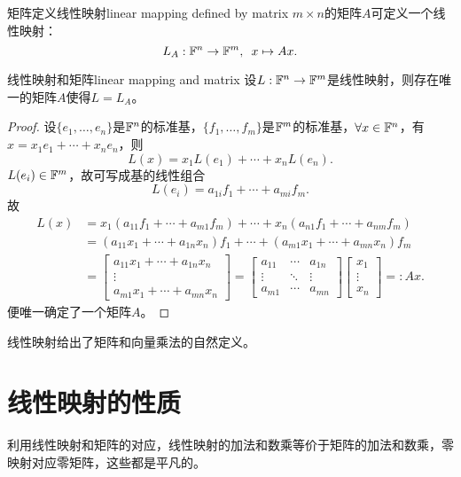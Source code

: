 \begin{example}{矩阵定义线性映射}{linear mapping defined by matrix}
	$m\times n$的矩阵$A$可定义一个线性映射：
	\begin{equation}
		L_A:\mathbb F^n\to\mathbb F^m,\enspace x\mapsto Ax.
	\end{equation}
\end{example}
\begin{theorem}{线性映射和矩阵}{linear mapping and matrix}
	设$L:\mathbb F^n\to\mathbb F^m$是线性映射，则存在唯一的矩阵$A$使得$L=L_A$。
\end{theorem}
\begin{proof}
	设$\{e_1,\ldots,e_n\}$是$\mathbb F^n$的标准基，$\{f_1,\ldots,f_m\}$是$\mathbb F^m$的标准基，$\forall x\in\mathbb F^n$，有$x=x_1e_1+\cdots+x_ne_n$，则
	\[
		L(x)=x_1L(e_1)+\cdots+x_nL(e_n).
	\]
	$L(e_i)\in\mathbb F^m$，故可写成基的线性组合
	\[
		L(e_i)=a_{1i}f_1+\cdots+a_{mi}f_m.
	\]
	故
	\begin{align*}
		L(x)&=x_1(a_{11}f_1+\cdots+a_{m1}f_m)+\cdots+x_n(a_{n1}f_1+\cdots+a_{nm}f_m)\\
		&=(a_{11}x_1+\cdots+a_{1n}x_n)f_1+\cdots+(a_{m1}x_1+\cdots+a_{mn}x_n)f_m\\
		&=\begin{bmatrix}
			a_{11}x_1+\cdots+a_{1n}x_n\\\vdots\\
			a_{m1}x_1+\cdots+a_{mn}x_n
		\end{bmatrix}=\begin{bmatrix}
			a_{11}&\cdots&a_{1n}\\
			\vdots&\ddots&\vdots\\
			a_{m1}&\cdots&a_{mn}
		\end{bmatrix}\begin{bmatrix}
			x_1\\\vdots\\x_n
		\end{bmatrix}=:Ax.
	\end{align*}
	便唯一确定了一个矩阵$A$。
\end{proof}

\begin{remark}
	线性映射给出了矩阵和向量乘法的自然定义。
\end{remark}

\section{线性映射的性质}
利用线性映射和矩阵的对应，线性映射的加法和数乘等价于矩阵的加法和数乘，零映射对应零矩阵，这些都是平凡的。

